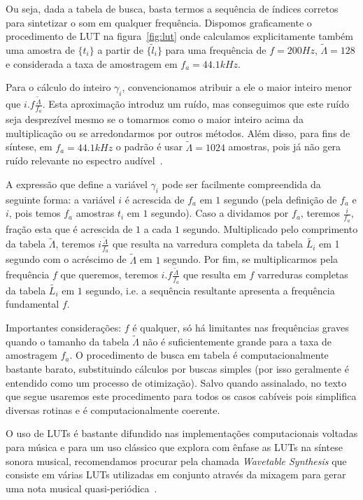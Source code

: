 Ou seja, dada a tabela de busca, basta termos a sequência de índices corretos
para sintetizar o som em qualquer frequência. Dispomos graficamente
o procedimento de LUT na figura~\ref{fig:lut} onde calculamos explicitamente
também uma amostra de $\{t_i\}$ a partir de $\{\widetilde{l}_i\}$ para uma frequência
de $f=200Hz$, $\widetilde{\Lambda}=128$ e considerada a taxa de amostragem em $f_a=44.1kHz$.


Para o cálculo do inteiro $\gamma_i$, convencionamos
atribuir a ele o maior inteiro menor que $i.f\frac{\widetilde{\Lambda}}{f_a}$.
Esta aproximação introduz um ruído, mas conseguimos que este ruído seja desprezível
mesmo se o tomarmos como o maior inteiro acima da multiplicação
ou se arredondarmos por outros métodos. Além disso, para fins de síntese, em $f_a=44.1 kHz$
 o padrão é usar $\widetilde{\Lambda} = 1024$ amostras, pois já não gera ruído
 relevante no espectro audível~\cite{Geiger}.

 A expressão que define a variável $\gamma_i$ pode ser facilmente compreendida da
 seguinte forma: a variável $i$ é acrescida de $f_a$ em $1$ segundo (pela
 definição de $f_a$ e $i$, pois temos $f_a$ amostras $t_i$ em $1$ segundo). Caso a dividamos por $f_a$, teremos $\frac{i}{f_a}$,
fração esta que é acrescida de $1$ a cada $1$ segundo. Multiplicado pelo comprimento da
 tabela $\widetilde{\Lambda}$, teremos $i \frac{\widetilde{\Lambda}}{f_a}$
 que resulta na varredura completa da tabela $\widetilde{L_i}$ em 
 1 segundo com o acréscimo de $\widetilde{\Lambda}$ em $1$ segundo. Por fim,
 se multiplicarmos pela frequência $f$ que queremos, teremos $i . f \frac{\widetilde{\Lambda}}{f_a}$
 que resulta em $f$ varreduras completas da tabela $\widetilde{L_i}$ em $1$ segundo, i.e. a sequência
 resultante apresenta a frequência fundamental $f$.

Importantes considerações: $f$ é qualquer, só há limitantes nas frequências
graves quando o tamanho da tabela $\widetilde{\Lambda}$ não é suficientemente grande para a taxa de amostragem
$f_a$. O procedimento de busca em tabela
é computacionalmente bastante barato, substituindo cálculos por buscas simples (por isso geralmente
é entendido como um processo de otimização). Salvo quando assinalado,
no texto que segue usaremos este procedimento para todos os casos cabíveis pois
simplifica diversas rotinas e é computacionalmente coerente.

O uso de LUTs é bastante difundido nas implementações computacionais
voltadas para música e para um uso clássico que explora com ênfase
as LUTs na síntese sonora musical, recomendamos procurar pela chamada 
\emph{Wavetable Synthesis} que consiste em várias LUTs utilizadas em 
conjunto através da mixagem para gerar uma nota musical quasi-periódica~\cite{Cook,Wavetable}.


